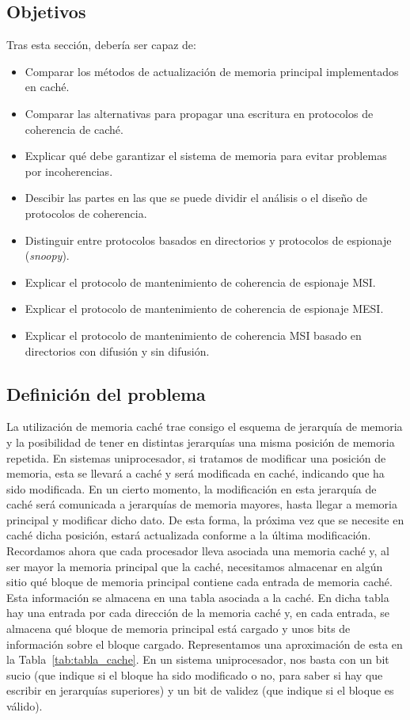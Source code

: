 \subsection{Objetivos}
Tras esta sección, debería ser capaz de:
\begin{itemize}
    \item Comparar los métodos de actualización de memoria principal implementados en caché.
    \item Comparar las alternativas para propagar una escritura en protocolos de coherencia de caché.
    \item Explicar qué debe garantizar el sistema de memoria para evitar problemas por incoherencias.
    \item Descibir las partes en las que se puede dividir el análisis o el diseño de protocolos de coherencia.
    \item Distinguir entre protocolos basados en directorios y protocolos de espionaje (\emph{snoopy}).
    \item Explicar el protocolo de mantenimiento de coherencia de espionaje MSI\@.
    \item Explicar el protocolo de mantenimiento de coherencia de espionaje MESI\@.
    \item Explicar el protocolo de mantenimiento de coherencia MSI basado en directorios con difusión y sin difusión.
\end{itemize}

\subsection{Definición del problema}
La utilización de memoria caché trae consigo el esquema de jerarquía de memoria y la posibilidad de tener en distintas jerarquías una misma posición de memoria repetida. En sistemas uniprocesador, si tratamos de modificar una posición de memoria, esta se llevará a caché y será modificada en caché, indicando que ha sido modificada. En un cierto momento, la modificación en esta jerarquía de caché será comunicada a jerarquías de memoria mayores, hasta llegar a memoria principal y modificar dicho dato. De esta forma, la próxima vez que se necesite en caché dicha posición, estará actualizada conforme a la última modificación.\\

Recordamos ahora que cada procesador lleva asociada una memoria caché y, al ser mayor la memoria principal que la caché, necesitamos almacenar en algún sitio qué bloque de memoria principal contiene cada entrada de memoria caché. Esta información se almacena en una tabla asociada a la caché. En dicha tabla hay una entrada por cada dirección de la memoria caché y, en cada entrada, se almacena qué bloque de memoria principal está cargado y unos bits de información sobre el bloque cargado. Representamos una aproximación de esta en la Tabla~\ref{tab:tabla_cache}. En un sistema uniprocesador, nos basta con un bit sucio (que indique si el bloque ha sido modificado o no, para saber si hay que escribir en jerarquías superiores) y un bit de validez (que indique si el bloque es válido).\\

